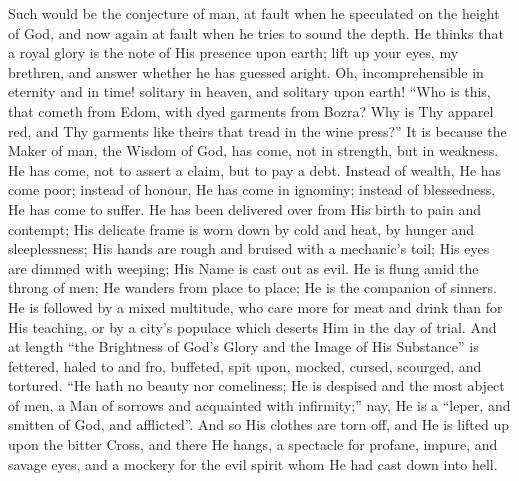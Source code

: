 Such would be the conjecture of man, at fault when he speculated on
the height of God, and now again at fault when he tries to sound the
depth. He thinks that a royal glory is the note of His presence upon
earth; lift up your eyes, my brethren, and answer whether he has
guessed aright. Oh, incomprehensible in eternity and in time! solitary
in heaven, and solitary upon earth! ``Who is this, that cometh
from Edom, with dyed garments from Bozra? Why is Thy apparel red, and
Thy garments like theirs that tread in the wine press?'' It is
because the Maker of man, the Wisdom of God, has come, not in
strength, but in weakness. He has come, not to assert a claim, but to
pay a debt. Instead of wealth, He has come poor; instead of honour, He
has come in ignominy; instead of blessedness, He has come to suffer.
He has been delivered over from His birth to pain and contempt; His
delicate frame is worn down by cold and heat, by hunger and
sleeplessness; His hands are rough and bruised with a mechanic's toil;
His eyes are dimmed with weeping; His Name is cast out as evil. He is
flung amid the throng of men; He wanders from place to place; He is
the companion of sinners. He is followed by a mixed multitude, who
care more for meat and drink than for His teaching, or by a city's
populace which deserts Him in the day of trial. And at length
``the Brightness of God's Glory and the Image of His
Substance'' is fettered, haled to and fro, buffeted, spit upon,
mocked, cursed, scourged, and tortured. ``He hath no beauty nor
comeliness; He is despised and the most abject of men, a Man of
sorrows and acquainted with infirmity;'' nay, He is a ``leper,
and smitten of God, and afflicted''. And so His clothes are torn
off, and He is lifted up upon the bitter Cross, and there He hangs, a
spectacle for profane, impure, and savage eyes, and a mockery for the
evil spirit whom He had cast down into hell.

